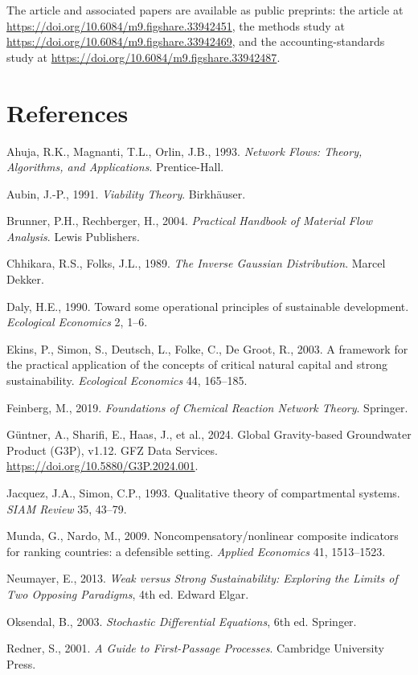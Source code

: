 \documentclass[11pt]{article}
\begin{document}
The article and associated papers are available as public preprints: the article at \url{https://doi.org/10.6084/m9.figshare.33942451}, the methods study at \url{https://doi.org/10.6084/m9.figshare.33942469}, and the accounting-standards study at \url{https://doi.org/10.6084/m9.figshare.33942487}.

\section*{References}

Ahuja, R.K., Magnanti, T.L., Orlin, J.B., 1993. \emph{Network Flows: Theory, Algorithms, and Applications}. Prentice-Hall.

Aubin, J.-P., 1991. \emph{Viability Theory}. Birkh\"auser.

Brunner, P.H., Rechberger, H., 2004. \emph{Practical Handbook of Material Flow Analysis}. Lewis Publishers.

Chhikara, R.S., Folks, J.L., 1989. \emph{The Inverse Gaussian Distribution}. Marcel Dekker.

Daly, H.E., 1990. Toward some operational principles of sustainable development. \emph{Ecological Economics} 2, 1--6.

Ekins, P., Simon, S., Deutsch, L., Folke, C., De Groot, R., 2003. A framework for the practical application of the concepts of critical natural capital and strong sustainability. \emph{Ecological Economics} 44, 165--185.

Feinberg, M., 2019. \emph{Foundations of Chemical Reaction Network Theory}. Springer.

G\"untner, A., Sharifi, E., Haas, J., et al., 2024. Global Gravity-based Groundwater Product (G3P), v1.12. GFZ Data Services. \url{https://doi.org/10.5880/G3P.2024.001}.

Jacquez, J.A., Simon, C.P., 1993. Qualitative theory of compartmental systems. \emph{SIAM Review} 35, 43--79.

Munda, G., Nardo, M., 2009. Noncompensatory/nonlinear composite indicators for ranking countries: a defensible setting. \emph{Applied Economics} 41, 1513--1523.

Neumayer, E., 2013. \emph{Weak versus Strong Sustainability: Exploring the Limits of Two Opposing Paradigms}, 4th ed. Edward Elgar.

Oksendal, B., 2003. \emph{Stochastic Differential Equations}, 6th ed. Springer.

Redner, S., 2001. \emph{A Guide to First-Passage Processes}. Cambridge University Press.
\end{document}
